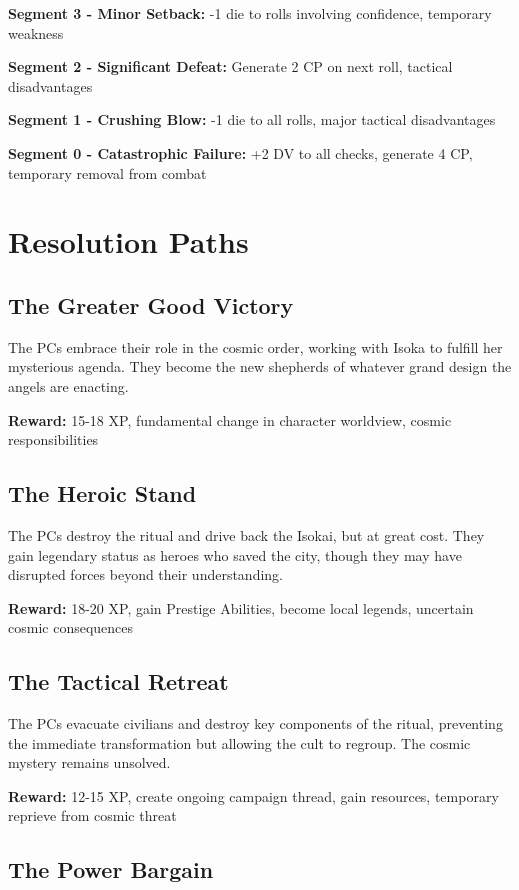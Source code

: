 \documentclass[12pt,twoside]{article}
\begin{document}
\textbf{Segment 3 - Minor Setback:} -1 die to rolls involving confidence, temporary weakness

\textbf{Segment 2 - Significant Defeat:} Generate 2 CP on next roll, tactical disadvantages

\textbf{Segment 1 - Crushing Blow:} -1 die to all rolls, major tactical disadvantages

\textbf{Segment 0 - Catastrophic Failure:} +2 DV to all checks, generate 4 CP, temporary removal from combat

\section{Resolution Paths}

\subsection{The Greater Good Victory}

The PCs embrace their role in the cosmic order, working with Isoka to fulfill her mysterious agenda. They become the new shepherds of whatever grand design the angels are enacting.

\textbf{Reward:} 15-18 XP, fundamental change in character worldview, cosmic responsibilities

\subsection{The Heroic Stand}

The PCs destroy the ritual and drive back the Isokai, but at great cost. They gain legendary status as heroes who saved the city, though they may have disrupted forces beyond their understanding.

\textbf{Reward:} 18-20 XP, gain Prestige Abilities, become local legends, uncertain cosmic consequences

\subsection{The Tactical Retreat}

The PCs evacuate civilians and destroy key components of the ritual, preventing the immediate transformation but allowing the cult to regroup. The cosmic mystery remains unsolved.

\textbf{Reward:} 12-15 XP, create ongoing campaign thread, gain resources, temporary reprieve from cosmic threat

\subsection{The Power Bargain}
\end{document}
